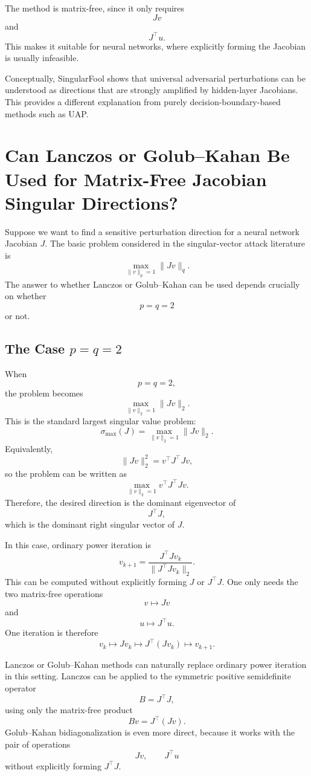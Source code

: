 \documentclass{article}
\begin{document}
The method is matrix-free, since it only requires
\[
Jv
\]
and
\[
J^\top u.
\]
This makes it suitable for neural networks, where explicitly forming the Jacobian is usually infeasible.

Conceptually, SingularFool shows that universal adversarial perturbations can be understood as directions that are strongly amplified by hidden-layer Jacobians. This provides a different explanation from purely decision-boundary-based methods such as UAP.

\section{Can Lanczos or Golub--Kahan Be Used for Matrix-Free Jacobian Singular Directions?}

Suppose we want to find a sensitive perturbation direction for a neural network Jacobian \(J\). The basic problem considered in the singular-vector attack literature is
\[
\max_{\|v\|_p=1}\|Jv\|_q.
\]
The answer to whether Lanczos or Golub--Kahan can be used depends crucially on whether
\[
p=q=2
\]
or not.

\subsection{The Case \(p=q=2\)}

When
\[
p=q=2,
\]
the problem becomes
\[
\max_{\|v\|_2=1}\|Jv\|_2.
\]
This is the standard largest singular value problem:
\[
\sigma_{\max}(J)
=
\max_{\|v\|_2=1}\|Jv\|_2.
\]
Equivalently,
\[
\|Jv\|_2^2
=
v^\top J^\top Jv,
\]
so the problem can be written as
\[
\max_{\|v\|_2=1}v^\top J^\top Jv.
\]
Therefore, the desired direction is the dominant eigenvector of
\[
J^\top J,
\]
which is the dominant right singular vector of \(J\).

In this case, ordinary power iteration is
\[
v_{k+1}
=
\frac{J^\top Jv_k}{\|J^\top Jv_k\|_2}.
\]
This can be computed without explicitly forming \(J\) or \(J^\top J\). One only needs the two matrix-free operations
\[
v\mapsto Jv
\]
and
\[
u\mapsto J^\top u.
\]
One iteration is therefore
\[
v_k
\longmapsto
Jv_k
\longmapsto
J^\top(Jv_k)
\longmapsto
v_{k+1}.
\]

Lanczos or Golub--Kahan methods can naturally replace ordinary power iteration in this setting. Lanczos can be applied to the symmetric positive semidefinite operator
\[
B=J^\top J,
\]
using only the matrix-free product
\[
Bv=J^\top(Jv).
\]
Golub--Kahan bidiagonalization is even more direct, because it works with the pair of operations
\[
Jv,\qquad J^\top u
\]
without explicitly forming \(J^\top J\).
\end{document}
